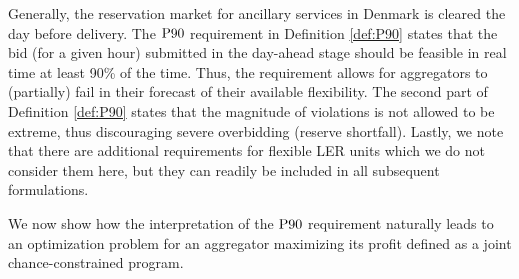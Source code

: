 \documentclass[conference]{IEEEtran}
\begin{document}
Generally, the reservation market for ancillary services in Denmark is cleared the day before delivery. The $\rm{P90}$ requirement in Definition \ref{def:P90} states that the bid (for a given hour) submitted in the day-ahead stage should be feasible in real time at least 90\% of the time. Thus, the requirement allows for aggregators to (partially) fail in their forecast of their available flexibility. The second part of Definition \ref{def:P90} states that the magnitude of violations is not allowed to be extreme, thus discouraging severe overbidding (reserve shortfall). Lastly, we note that there are additional requirements for flexible \ac{LER} units \cite{energinet} which we do not consider them here, but they can readily be included in all subsequent formulations.

We now show how the interpretation of the $\rm{P90}$ requirement naturally leads to an optimization problem for an aggregator maximizing its profit defined as a joint chance-constrained program.

\vspace{1mm}
\end{document}

